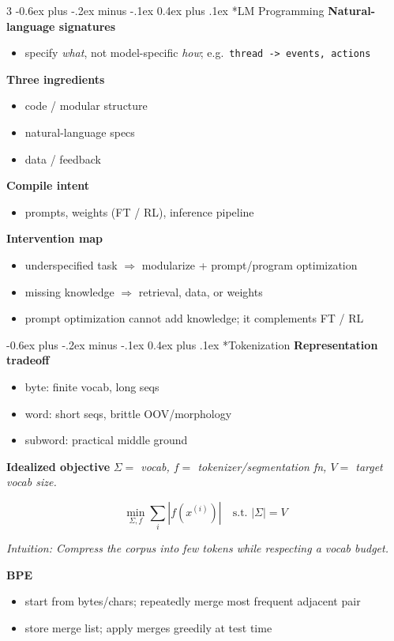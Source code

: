 \documentclass[10pt,landscape]{article}
\makeatletter
\renewcommand{\section}{\@startsection{section}{1}{0mm}%
  {-0.6ex plus -.2ex minus -.1ex}%
  {0.4ex plus .1ex}%
  {\normalfont\normalsize\bfseries}}
\newcommand{\head}[1]{\section*{#1}}
\newcommand{\mini}[1]{\textbf{#1}}
\newcommand{\defs}[1]{{\emph{#1}}\par}
\newcommand{\intuition}[1]{{\scriptsize\emph{Intuition: #1}\par}}
\makeatother
\begin{document}
\begin{multicols}{3}
\head{LM Programming}
\mini{Natural-language signatures}
\begin{itemize}
\item specify \emph{what}, not model-specific \emph{how}; e.g.\ \texttt{thread -> events, actions}
\end{itemize}

\mini{Three ingredients}
\begin{itemize}
\item code / modular structure
\item natural-language specs
\item data / feedback
\end{itemize}

\mini{Compile intent}
\begin{itemize}
\item prompts, weights (FT / RL), inference pipeline
\end{itemize}

\mini{Intervention map}
\begin{itemize}
\item underspecified task \(\Rightarrow\) modularize + prompt/program optimization
\item missing knowledge \(\Rightarrow\) retrieval, data, or weights
\item prompt optimization cannot add knowledge; it complements FT / RL
\end{itemize}

\head{Tokenization}
\mini{Representation tradeoff}
\begin{itemize}
\item byte: finite vocab, long seqs
\item word: short seqs, brittle OOV/morphology
\item subword: practical middle ground
\end{itemize}

\mini{Idealized objective}
\defs{\(\Sigma=\) vocab,\; \(f=\) tokenizer/segmentation fn,\; \(V=\) target vocab size.}
\[
\min_{\Sigma,f}\sum_i |f(x^{(i)})|
\quad
\text{s.t. } |\Sigma|=V
\]
\intuition{Compress the corpus into few tokens while respecting a vocab budget.}

\mini{BPE}
\begin{itemize}
\item start from bytes/chars; repeatedly merge most frequent adjacent pair
\item store merge list; apply merges greedily at test time
\end{itemize}


\end{multicols}
\end{document}
